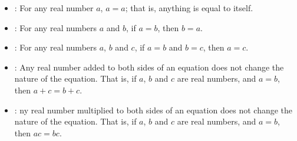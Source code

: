 \begin{property}[frametitle={Properties of Equality}]
\begin{itemize}
\item {}: For any real number $a$, $a
= a$; that is, anything is equal to itself.
\item {}: For any real numbers $a$ and $b$, if $a=b$, then $b=a$.
\item {}: For any real numbers $a$, $b$ and $c$, if $a=b$ and $b=c$, then $a=c$.
\item {} : Any real number added to both sides of an
equation does not change the nature of the equation. That is, if $a$, $b$ and $c$ are real numbers, and $a = b$, then $a + c = b + c$.
\item {} : ny real number multiplied to both sides
of an equation does not change the nature of the equation. That is, if $a$, $b$ and $c$ are real numbers, and $a = b$, then $ac = b c$.
\end{itemize}
\end{property}
